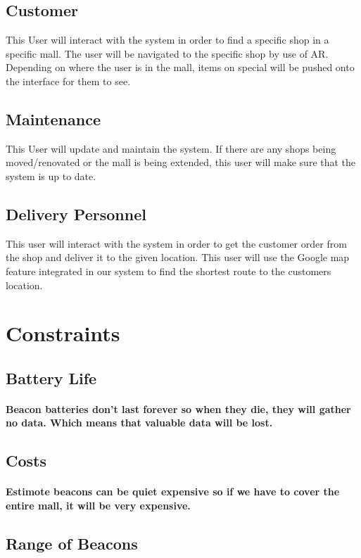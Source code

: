 \documentclass{article}
\begin{document}
\subsection{Customer}
This User will interact with the system in order to find a specific shop in a specific mall. The user will be navigated to the specific shop by use of AR. Depending on where the user is in the mall, items on special will be pushed onto the interface for them to see.
\subsection{Maintenance}
This User will update and maintain the system. If there are any shops being moved/renovated or the mall is being extended, this user will make sure that the system is up to date.
\subsection{Delivery Personnel}
This user will interact with the system in order to get the customer order from the shop and deliver it to the given location. This user will use the Google map feature integrated in our system to find the shortest route to the customers location.

\section{Constraints}

\subsection{Battery Life}
\paragraph{Beacon batteries don't last forever so when they die, they will gather no data. Which means that valuable data will be lost.}

\subsection{Costs}
\paragraph{Estimote beacons can be quiet expensive so if we have to cover the entire mall, it will be very expensive.}

\subsection{Range of Beacons} 
\end{document}
